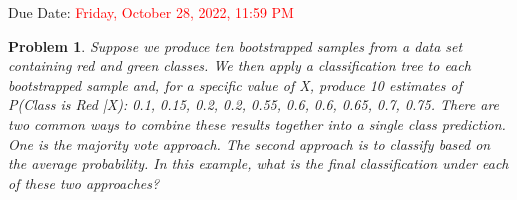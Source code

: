 \documentclass[12pt]{article}
\newtheorem{problem}{Problem}
\begin{document}
\pagestyle{fancy}
\fancyhf{}

\noindent Due Date: \textcolor{red}{Friday, October 28, 2022, 11:59 PM}
\begin{abstract}
    In this assignment, you will learn about linear regression and classification. The questions below can be answered with the help of the book. Show all calculations done step-by-step. In problem 3, you need not worry about being "mathematically" correct.
    Please follow the same notation as in the book. You are allowed to work on teams of up to three people. If working as a team, every member of the team should submit the (same) report. All reports and supplemental material must be zipped as \texttt{team\#\_Assignment\#.zip} and uploaded on Blackboard.
\end{abstract}

\begin{problem}
Suppose we produce ten bootstrapped samples from a data set containing red
and green classes. We then apply a classification tree to each bootstrapped sample and, for a
specific value of X, produce 10 estimates of P(Class is Red |X):
0.1, 0.15, 0.2, 0.2, 0.55, 0.6, 0.6, 0.65, 0.7, 0.75.
There are two common ways to combine these results together into a single class prediction. One is the majority vote approach. The second approach is to classify based on the
average probability. In this example, what is the final classification under each of these two
approaches?

\end{problem}
\end{document}
